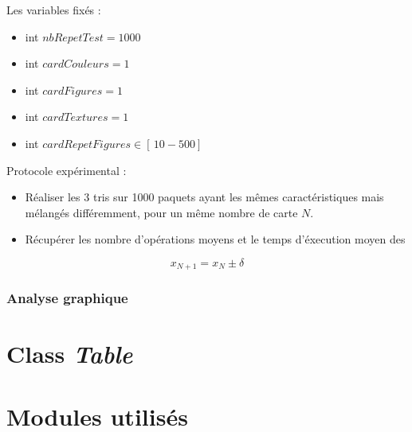 \documentclass{report}
\begin{document}
Les variables fixés : \\
\begin{itemize}

	\item int $nbRepetTest = 1000$
	\item int $cardCouleurs = 1$
	\item int $cardFigures = 1$
	\item int $cardTextures = 1$
	
	\item int $cardRepetFigures \in [\, 10-500 ]\, $
	
	
	
\end{itemize}

Protocole expérimental :
\begin{itemize}
	\item Réaliser les 3 tris sur 1000 paquets ayant les mêmes caractéristiques mais mélangés différemment, pour un même nombre de carte $N$.
	\item Récupérer les nombre d'opérations moyens et le temps d'éxecution moyen des 
\end{itemize}

\boldmath
\begin{equation}
  x_{N+1}=x_{N}\pm \delta
\end{equation}
\unboldmath



\subsection{Analyse graphique}



\chapter{Class \it Table}

























\appendix
\chapter{Modules utilisés}
\end{document}
